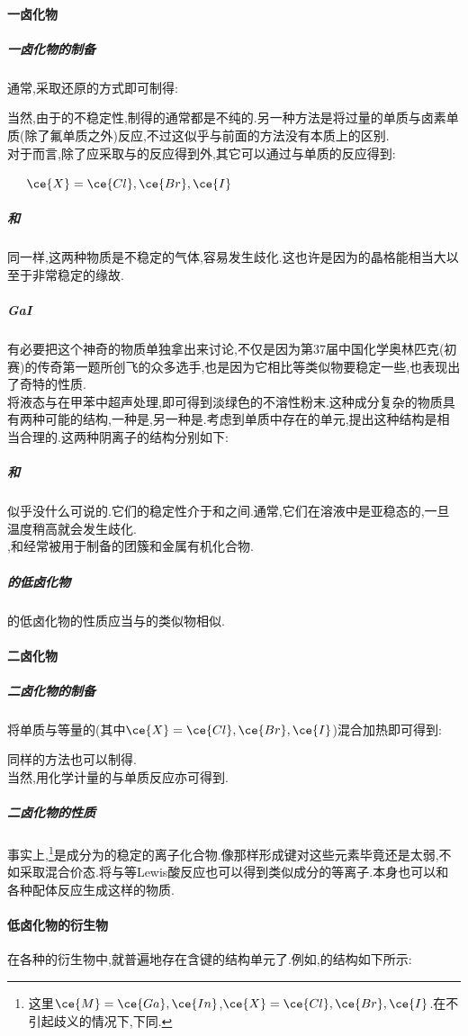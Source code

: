 \documentclass{ctexart}
\begin{document}
\paragraph{一卤化物}
\subparagraph{一卤化物的制备}
通常,采取还原的方式即可制得:
\begin{center}
\end{center}
当然,由于的不稳定性,制得的通常都是不纯的.另一种方法是将过量的单质与卤素单质(除了氟单质之外)反应,不过这似乎与前面的方法没有本质上的区别.\\
\indent 对于而言,除了应采取与的反应得到外,其它可以通过与单质的反应得到:
\begin{center}
    \ \ \ $\ce{X}=\ce{Cl},\ce{Br},\ce{I}$
\end{center}
\subparagraph{和}
同一样,这两种物质是不稳定的气体,容易发生歧化.这也许是因为的晶格能相当大以至于非常稳定的缘故.
\subparagraph{GaI}
有必要把这个神奇的物质单独拿出来讨论,不仅是因为第37届中国化学奥林匹克(初赛)的传奇第一题所创飞的众多选手,也是因为它相比等类似物要稳定一些,也表现出了奇特的性质.\\
\indent 将液态与在甲苯中超声处理,即可得到淡绿色的不溶性粉末.这种成分复杂的物质具有两种可能的结构,一种是\ce{[Ga2][Ga]+[GaI4]-},另一种是.考虑到单质中存在的单元,提出这种结构是相当合理的.这两种阴离子的结构分别如下:
\subparagraph{和}
似乎没什么可说的.它们的稳定性介于和之间.通常,它们在溶液中是亚稳态的,一旦温度稍高就会发生歧化.\\
\indent {},和经常被用于制备的团簇和金属有机化合物.
\subparagraph{的低卤化物}
的低卤化物的性质应当与的类似物相似.
\paragraph{二卤化物}
\subparagraph{二卤化物的制备}
将单质与等量的(其中$\ce{X}=\ce{Cl},\ce{Br},\ce{I}$)混合加热即可得到:
\begin{center}
\end{center}
同样的方法也可以制得.\\
\indent 当然,用化学计量的与单质反应亦可得到.
\begin{center}
\end{center}
\subparagraph{二卤化物的性质}
事实上,\footnote{这里$\ce{M}=\ce{Ga},\ce{In}$,$\ce{X}=\ce{Cl},\ce{Br},\ce{I}$.在不引起歧义的情况下,下同.}是成分为的稳定的离子化合物.像那样形成键对这些元素毕竟还是太弱,不如采取混合价态.将与等Lewis酸反应也可以得到类似成分的\ce{[M]+[AlX4]-}等离子.本身也可以和各种配体反应生成\ce{[GaL4]+[GaX4]-}这样的物质.
\paragraph{低卤化物的衍生物}
在各种的衍生物中,就普遍地存在含键的结构单元了.例如,的结构如下所示:
\end{document}
